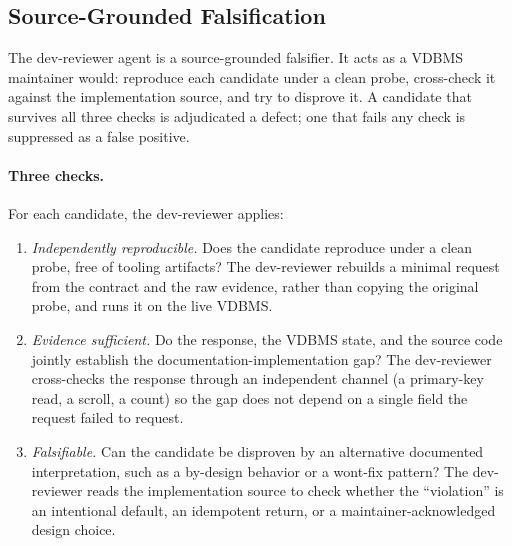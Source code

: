 \documentclass[sigconf]{acmart}
\begin{document}
\subsection{Source-Grounded Falsification}
\label{subsec:falsification}

The dev-reviewer agent is a source-grounded falsifier. It acts as a VDBMS maintainer would: reproduce each candidate under a clean probe, cross-check it against the implementation source, and try to disprove it. A candidate that survives all three checks is adjudicated a defect; one that fails any check is suppressed as a false positive.

\paragraph{Three checks.}
For each candidate, the dev-reviewer applies:
\begin{enumerate}
  \item \emph{Independently reproducible.} Does the candidate reproduce under a clean probe, free of tooling artifacts? The dev-reviewer rebuilds a minimal request from the contract and the raw evidence, rather than copying the original probe, and runs it on the live VDBMS.
  \item \emph{Evidence sufficient.} Do the response, the VDBMS state, and the source code jointly establish the documentation-implementation gap? The dev-reviewer cross-checks the response through an independent channel (a primary-key read, a scroll, a count) so the gap does not depend on a single field the request failed to request.
  \item \emph{Falsifiable.} Can the candidate be disproven by an alternative documented interpretation, such as a by-design behavior or a wont-fix pattern? The dev-reviewer reads the implementation source to check whether the ``violation'' is an intentional default, an idempotent return, or a maintainer-acknowledged design choice.
\end{enumerate}
\end{document}

